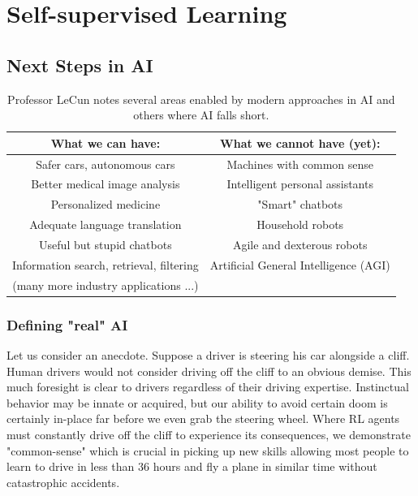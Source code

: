 \chapter{Self-supervised Learning}
\section{Next Steps in AI}

\begin{table}
\begin{center}
\begin{tabular}{ |c||c| } 
 \hline
 What we can have: & What we cannot have (yet): \\ 
 \hline
 \hline
 Safer cars, autonomous cars & Machines with common sense \\ 
 Better medical image analysis & Intelligent personal assistants \\ 
 Personalized medicine & "Smart" chatbots \\
 Adequate language translation & Household robots \\
 Useful but stupid chatbots & Agile and dexterous robots \\
 Information search, retrieval, filtering & Artificial General Intelligence (AGI) \\
 (many more industry applications ...) & \\
 \hline
\end{tabular}
\caption{Professor LeCun notes several areas enabled by modern approaches in AI and others where AI falls short.}
\end{center}
\end{table}

\subsection{Defining "real" AI}

Let us consider an anecdote. Suppose a driver is steering his car alongside a cliff. Human drivers would not consider driving off the cliff to an obvious demise. 
This much foresight is clear to drivers regardless of their driving expertise. Instinctual behavior may be innate or acquired, but our ability to avoid certain doom is certainly in-place far before we even grab the steering wheel. 
Where RL agents must constantly drive off the cliff to experience its consequences, we demonstrate "common-sense" which is crucial in picking up new skills allowing most people to learn to drive in less than $36$ hours and fly a plane in similar time without catastrophic accidents.

